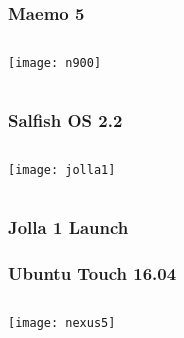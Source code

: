 \documentclass[
	notes=none,
	aspectratio=169
]{beamer}
\begin{document}

\begin{frame}
\frametitle{Maemo 5}

\begin{columns}[T]
\begin{column}[T]{1.0\textwidth}

\vspace{0.8cm}
\begin{center}
\texttt{[image: n900]}
\end{center}

\end{column}
\end{columns}

\end{frame}
\note{
}


\begin{frame}
\frametitle{Salfish OS 2.2}

\begin{columns}[T]
\begin{column}[T]{1.0\textwidth}

\vspace{0.3cm}
\begin{center}
\texttt{[image: jolla1]}
\end{center}

\end{column}
\end{columns}

\end{frame}
\note{
}


\begin{frame}
\frametitle{Jolla 1 Launch}


\end{frame}
\note{
}


\begin{frame}
\frametitle{Ubuntu Touch 16.04}

\begin{columns}[T]
\begin{column}[T]{1.0\textwidth}

\vspace{0.4cm}
\begin{center}
\texttt{[image: nexus5]}
\end{center}

\end{column}
\end{columns}

\end{frame}
\note{
}
\end{document}
